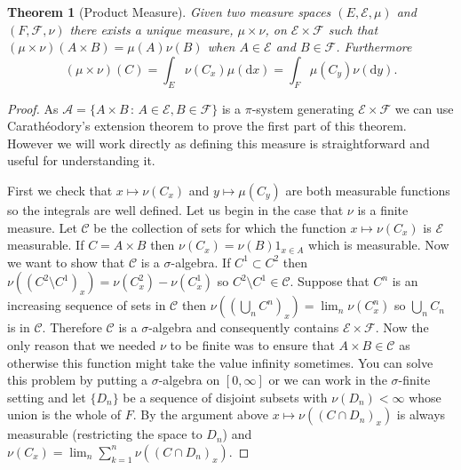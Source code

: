 \documentclass[11pt]{article}
\newtheorem{thm}{Theorem}[section]
\theoremstyle{definition}
\theoremstyle{remark}
\begin{document}
\begin{thm}[Product Measure]
Given two measure spaces $(E, \mathcal{E}, \mu)$ and $(F, \mathcal{F}, \nu)$ there exists a unique measure, $\mu \times \nu$, on $\mathcal{E} \times \mathcal{F}$ such that $(\mu \times \nu)(A \times B) = \mu(A)\nu(B)$ when $A \in \mathcal{E}$ and $B \in \mathcal{F}$. Furthermore
\[ (\mu \times \nu)(C) = \int_E \nu( C_x) \mu(\mathrm{d}x) = \int_F \mu(C_y) \nu(\mathrm{d}y).\]
\end{thm}
\begin{proof}
As $\mathcal{A} = \{ A \times B \,:\, A \in \mathcal{E}, B \in \mathcal{F}\}$ is a $\pi$-system generating $\mathcal{E} \times \mathcal{F}$ we can use Carath\'eodory's extension theorem to prove the first part of this theorem. However we will work directly as defining this measure is straightforward and useful for understanding it.

First we check that $x \mapsto \nu(C_x)$ and $y \mapsto \mu(C_y)$ are both measurable functions so the integrals are well defined. Let us begin in the case that $\nu$ is a finite measure. Let $\mathcal{C}$ be the collection of sets for which the function $x \mapsto \nu(C_x)$ is $\mathcal{E}$ measurable. If $C = A \times B$ then $\nu(C_x) = \nu(B)1_{x \in A}$ which is measurable. Now we want to show that $\mathcal{C}$ is a $\sigma$-algebra. If $C^1 \subset C^2$ then $\nu((C^2 \setminus C^1)_x) = \nu(C^2_x) - \nu(C^1_x)$ so $C^2 \setminus C^1 \in \mathcal{C}$. Suppose that $C^n$ is an increasing sequence of sets in $\mathcal{C}$ then $\nu\left( \left(\bigcup_n C^n\right)_x\right) = \lim_n \nu \left( C^n_x\right)$ so $\bigcup_n C_n$ is in $\mathcal{C}$. Therefore $\mathcal{C}$ is a $\sigma$-algebra and consequently contains $\mathcal{E} \times \mathcal{F}$. Now the only reason that we needed $\nu$ to be finite was to ensure that $A \times B \in \mathcal{C}$ as otherwise this function might take the value infinity sometimes. You can solve this problem by putting a $\sigma$-algebra on $[0,\infty]$ or we can work in the $\sigma$-finite setting and let $\{D_n\}$ be a sequence of disjoint subsets with $\nu(D_n)< \infty$ whose union is the whole of $F$. By the argument above $x \mapsto \nu((C\cap D_n)_x)$ is always measurable (restricting the space to $D_n$) and $\nu(C_x) = \lim_n \sum_{k=1}^n \nu((C \cap D_n)_x)$.


\end{proof}
\end{document}
